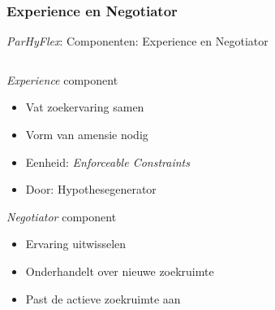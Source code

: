 \documentclass[handout]{beamer}
\newcommand{\parhyflexmech}{\node[draw=white,rectangle,minimum width=8 cm, minimum height=5 cm,fill=blue!20] (Machine) at (0,0) {};
\draw[black] ($(Machine.east)+(0,0.3)$) -- (Machine.north east) -| (Machine.south west) -| ($(Machine.east)+(0,-0.3)$);
\coordinate (OC) at (Machine.east);
\draw[dashed,->] (OC) to node[above,sloped]{\tiny World} ++(1,0);
\node[draw,rectangle,fill=gray!20,minimum width=4 cm, minimum height=0.5cm] (EXC) at (-1.8,2.05) {Execution Mechanism};
\node[draw,rectangle,fill=gray!20,minimum width=1 cm, minimum height=1cm] (EXP) at (3,1.8) {\tiny{Experience}};
\draw[orange,->] (EXC.east) to node[above]{\tiny Amnesia} (EXP.west |- EXC.east);
\node[draw,rectangle,fill=gray!20,minimum width=1 cm, minimum height=1cm] (NGT) at (3,-1.8) {\tiny{Negotiator}};
\draw[red,->] (EXP) to node[above,sloped]{\tiny Constraints} (NGT);
\draw[dashed,<-] (NGT.east) .. controls ($(NGT.east)+(1,0)$) and ($(OC)+(-1,0)$) .. (OC);
\node[draw,rectangle,fill=gray!20,minimum width=1 cm, minimum height=1cm] (SSP) at (0,-1.8) {\tiny{Search Space}};
\draw[red,->] (NGT) to node[above,sloped]{\tiny Constraints} (SSP);
\node[draw,dashed,rectangle,fill=gray!20,minimum width=0.5 cm, minimum height=0.5cm] (STA) at (1.5,1) {\tiny{State}};
\draw[dashed,<-] (STA.east) .. controls ($(STA.east)+(1,0)$) and ($(OC)+(-1,0)$) .. (OC);

\begin{scope}[xshift=-1.8 cm,yshift=0.55cm]
\node[draw,rectangle,fill=gray!20,minimum width=4 cm, minimum height=0.5cm] (MEM) at (0,0) {};
\foreach\x in {0,1,...,6} {
  \draw (0.5*\x-1.5,-0.25) -- ++(0,0.5);
}
\foreach\x in {2,...,7} {
  \draw[dotted,red!50!black] (MEM.south -| 0.5*\x-1.75,0) -- (SSP);
}
\foreach\x in {0,1} {
  \draw (0.5*\x-1.75,0) node {$s_{\x}$};
  \draw[<->] (MEM.north -| 0.5*\x-1.75,0) to node[sloped,above]{\tiny r/w} (EXC.south -| 0.5*\x-1.75,0);
  \draw[dashed] (MEM.south -| 0.5*\x-1.75,0) .. controls (0.5*\x-1.75,0.125*\x-1.75) and ($(OC)+(-3,0)$) .. (OC);
  \draw[->] (MEM.north -| 0.5*\x-1.625,0) .. controls (0.5*\x-1.625,-0.125*\x+0.75) and ($0.5*(EXP.west)+0.5*(EXP.south west)+(-3,0)$) .. ($0.5*(EXP.west)+0.5*(EXP.south west)$);
}
\foreach\x in {2,3} {
  \draw (0.5*\x-1.75,0) node {$s_{\x}$};
  \draw[->] (MEM.north -| 0.5*\x-1.75,0) to node[sloped,above]{\tiny read} (EXC.south -| 0.5*\x-1.75,0);
  \draw[<-,dashed] (MEM.south -| 0.5*\x-1.75,0) .. controls (0.5*\x-1.75,0.125*\x-1.75) and ($(OC)+(-3,0)$) .. (OC);
  \draw (0.5*\x-2,-0.25) -- ++(0.5,0.5);
}
\foreach\x in {4,5} {
  \draw (0.5*\x-1.75,0) node {$s_{\x}$};
  \draw[->] (MEM.north -| 0.5*\x-1.75,0) to node[sloped,above]{\tiny read} (EXC.south -| 0.5*\x-1.75,0);
  \draw[<-,dashed] (MEM.south -| 0.5*\x-1.75,0) .. controls (0.5*\x-1.75,0.125*\x-1.75) and ($(OC)+(-3,0)$) .. (OC);
  \draw (0.5*\x-2,0.25) -- ++(0.5,-0.5);
}
\foreach\x in {6,7} {
  \draw (0.5*\x-1.75,0) node {$s_{\x}$};
  \draw[->] (MEM.north -| 0.5*\x-1.75,0) to node[sloped,above]{\tiny read} (EXC.south -| 0.5*\x-1.75,0);
  \draw[<-,dashed] (MEM.south -| 0.5*\x-1.75,0) .. controls (0.5*\x-1.75,0.125*\x-1.75) and ($(OC)+(-3,0)$) .. (OC);
  \draw (0.5*\x-2,-0.25) -- ++(0.5,0.5);
  \draw (0.5*\x-2,0.25) -- ++(0.5,-0.5);
}
\end{scope}}
\begin{document}
\subsubsection{Experience en Negotiator}
\begin{frame}{\emph{ParHyFlex}: Componenten: Experience en Negotiator}
\begin{columns}[T]
\begin{column}{.65\textwidth}
  \begin{block}{\emph{Experience} component}
  \begin{itemize}[<+->]
  \item Vat zoekervaring samen
  \item Vorm van amensie nodig
  \item Eenheid: \emph{Enforceable Constraints}
  \item Door: Hypothesegenerator
  \end{itemize}
  \end{block}
  \begin{block}{\emph{Negotiator} component}
  \begin{itemize}
  \item Ervaring uitwisselen
  \item Onderhandelt over nieuwe zoekruimte
  \item Past de actieve zoekruimte aan
  \end{itemize}
  \end{block}
\end{column}
\begin{column}{.35\textwidth}
  \begin{figure}
  \end{figure}
\end{column}
\end{columns}
\end{frame}
\end{document}
